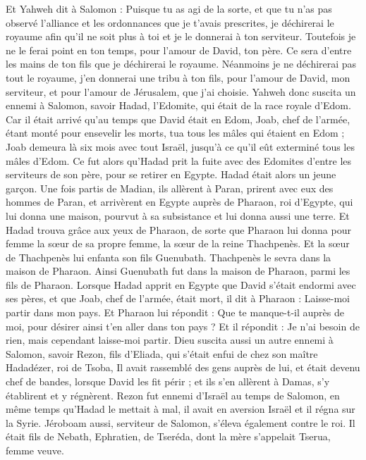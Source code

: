 \begin{multicols}{2}
Et Yahweh dit à Salomon : Puisque tu as agi de la sorte, et que tu n'as pas observé l’alliance et les ordonnances que je t'avais prescrites, je déchirerai le royaume afin qu'il ne soit plus à toi et je le donnerai à ton serviteur.
Toutefois je ne le ferai point en ton temps, pour l’amour de David, ton père. Ce sera d'entre les mains de ton fils que je déchirerai le royaume.
Néanmoins je ne déchirerai pas tout le royaume, j'en donnerai une tribu à ton fils, pour l'amour de David, mon serviteur, et pour l'amour de Jérusalem, que j'ai choisie.
Yahweh donc suscita un ennemi à Salomon, savoir Hadad, l’Edomite, qui était de la race royale d'Edom.
Car il était arrivé qu'au temps que David était en Edom, Joab, chef de l'armée, étant monté pour ensevelir les morts, tua tous les mâles qui étaient en Edom ;
Joab demeura là six mois avec tout Israël, jusqu'à ce qu'il eût exterminé tous les mâles d'Edom.
Ce fut alors qu’Hadad prit la fuite avec des Edomites d'entre les serviteurs de son père, pour se retirer en Egypte. Hadad était alors un jeune garçon.
Une fois partis de Madian, ils allèrent à Paran, prirent avec eux des hommes de Paran, et arrivèrent en Egypte auprès de Pharaon, roi d'Egypte, qui lui donna une maison, pourvut à sa subsistance et lui donna aussi une terre.
Et Hadad trouva grâce aux yeux de Pharaon, de sorte que Pharaon lui donna pour femme la sœur de sa propre femme, la sœur de la reine Thachpenès.
Et la sœur de Thachpenès lui enfanta son fils Guenubath. Thachpenès le sevra dans la maison de Pharaon. Ainsi Guenubath fut dans la maison de Pharaon, parmi les fils de Pharaon.
Lorsque Hadad apprit en Egypte que David s'était endormi avec ses pères, et que Joab, chef de l'armée, était mort, il dit à Pharaon : Laisse-moi partir dans mon pays.
Et Pharaon lui répondit : Que te manque-t-il auprès de moi, pour désirer ainsi t'en aller dans ton pays ? Et il répondit : Je n’ai besoin de rien, mais cependant laisse-moi partir.
Dieu suscita aussi un autre ennemi à Salomon, savoir Rezon, fils d'Eliada, qui s'était enfui de chez son maître Hadadézer, roi de Tsoba,
Il avait rassemblé des gens auprès de lui, et était devenu chef de bandes, lorsque David les fit périr ; et ils s'en allèrent à Damas, s’y établirent et y régnèrent.
Rezon fut ennemi d'Israël au temps de Salomon, en même temps qu’Hadad le mettait à mal, il avait en aversion Israël et il régna sur la Syrie.
Jéroboam aussi, serviteur de Salomon, s'éleva également contre le roi. Il était fils de Nebath, Ephratien, de Tseréda, dont la mère s’appelait Tserua, femme veuve.

\end{multicols}
